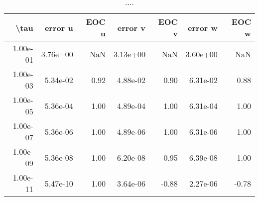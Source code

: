 \begin{table}[ht]
\centering
\begin{tabular}{rrrrrrr}
  \hline
  \textbf{\textbackslash{}tau} & \textbf{error u} & \textbf{EOC u} & \textbf{error v} & \textbf{EOC v} & \textbf{error w} & \textbf{EOC w} \\\hline
  1.00e-01 & 3.76e+00 & NaN & 3.13e+00 & NaN & 3.60e+00 & NaN \\
  1.00e-03 & 5.34e-02 & 0.92 & 4.88e-02 & 0.90 & 6.31e-02 & 0.88 \\
  1.00e-05 & 5.36e-04 & 1.00 & 4.89e-04 & 1.00 & 6.31e-04 & 1.00 \\
  1.00e-07 & 5.36e-06 & 1.00 & 4.89e-06 & 1.00 & 6.31e-06 & 1.00 \\
  1.00e-09 & 5.36e-08 & 1.00 & 6.20e-08 & 0.95 & 6.39e-08 & 1.00 \\
  1.00e-11 & 5.47e-10 & 1.00 & 3.64e-06 & -0.88 & 2.27e-06 & -0.78 \\\hline
\end{tabular}
\caption{....}
\end{table}
